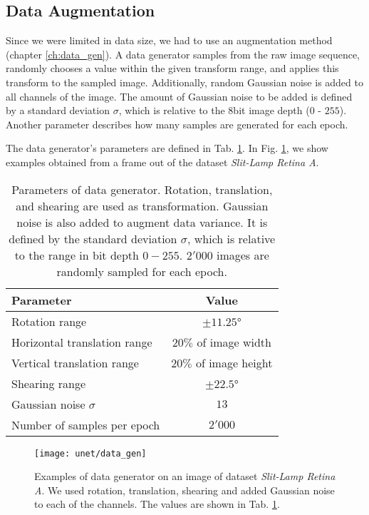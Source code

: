 \clearpage
\subsection{Data Augmentation} \label{results_data_gen}
Since we were limited in data size, we had to use an augmentation method (chapter \ref{ch:data_gen}). A data generator samples from the raw image sequence, randomly chooses a value within the given transform range, and applies this transform to the sampled image. Additionally, random Gaussian noise is added to all channels of the image. The amount of Gaussian noise to be added is defined by a standard deviation $\sigma$, which is relative to the $8$bit image depth ($0$ - $255$). Another parameter describes how many samples are generated for each epoch.

The data generator's parameters are defined in Tab. \ref{tab:data_gen_param}. In Fig. \ref{fig:data_gen}, we show examples obtained from a frame out of the dataset \textit{Slit-Lamp Retina A}.
\vspace{20pt}

\begin{table}[!htbp]
   \centering
   \caption[Data generator parameters]{Parameters of data generator. Rotation, translation, and shearing are used as transformation. Gaussian noise is also added to augment data variance. It is defined by the standard deviation $\sigma$, which is relative to the range in bit depth $0-255$. $2'000$ images are randomly sampled for each epoch.}
   \begin{tabular}{l|c}
      \toprule
      \textbf{Parameter} & \textbf{Value} \\
      \midrule
      Rotation range & $\pm11.25$° \\
      Horizontal translation range & $20\%$ of image width \\
      Vertical translation range & $20\%$ of image height \\
      Shearing range & $\pm22.5$° \\
      \midrule
      Gaussian noise $\sigma$ & $13$ \\
      \midrule
      Number of samples per epoch & $2'000$ \\
      \bottomrule
   \end{tabular}
   \label{tab:data_gen_param}
\end{table}
\vspace{30pt}

\begin{figure}[!htbp]
  \centering
  \texttt{[image: unet/data\_gen]}
  \caption[Examples of data generator]{Examples of data generator on an image of dataset \textit{Slit-Lamp Retina A}. We used rotation, translation, shearing and added Gaussian noise to each of the channels. The values are shown in Tab. \ref{tab:data_gen_param}.}
  \label{fig:data_gen}
\end{figure}

